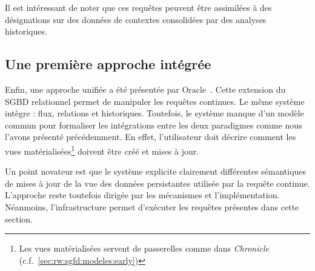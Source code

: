 Il est intéressant de noter que ces requêtes peuvent être assimilées à des désignations sur des données de contextes consolidées par des analyses historiques.

\subsection{Une première approche intégrée}
Enfin, une approche unifiée a été présentée par Oracle~\cite{Witkowski:oraclecq}. Cette extension du SGBD relationnel permet de manipuler les requêtes continues. Le même système intègre : flux, relations et historiques. Toutefois, le système manque d'un modèle commun pour formaliser les intégrations entre les deux paradigmes comme nous l'avons présenté précédemment. En effet, l'utilisateur doit décrire comment les vues matérialisées\footnote{Les vues matérialisées servent de passerelles comme dans \textit{Chronicle} (c.f.~\ref{sec:rw:sgfd:modeles:early})} doivent être créé et mises à jour. 

Un point novateur est que le système explicite clairement différentes sémantiques de mises à jour de la vue des données persistantes utilisée par la requête continue. L'approche reste toutefois dirigée par les mécanismes et l'implémentation. Néanmoins, l'infrastructure permet d'exécuter les requêtes présentes dans cette section.
